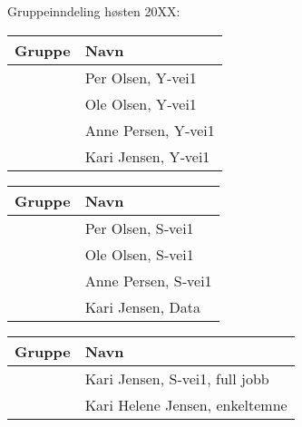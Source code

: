 \documentclass[11pt]{article}
\newcommand{\student}{\addtocounter{StudNo}{1}\arabic{StudNo}}
\newcommand{\gruppe}{\addtocounter{GruppeNo}{1}\arabic{GruppeNo}}
\begin{document}
Gruppeinndeling høsten 20XX:

\setcounter{StudNo}{0}
\setcounter{GruppeNo}{XX00}


\begin{table}[H]
  \centering
  \begin{tabular}{|p{2.5cm}|p{7cm}|}\hline
    Gruppe \gruppe & Navn \\\hline\hline
    \student & Per Olsen, Y‐vei1 \\\hline
    \student & Ole Olsen, Y‐vei1 \\\hline
    \student & Anne Persen, Y‐vei1 \\\hline
    \student & Kari Jensen, Y‐vei1 \\\hline
  \end{tabular}
\end{table}

\begin{table}[H]
  \centering
  \begin{tabular}{|p{2.5cm}|p{7cm}|}\hline
    Gruppe \gruppe & Navn \\\hline\hline
    \student & Per Olsen, S‐vei1 \\\hline
    \student & Ole Olsen, S‐vei1 \\\hline
    \student & Anne Persen, S‐vei1 \\\hline
    \student & Kari Jensen, Data \\\hline

  \end{tabular}
\end{table}

\begin{table}[H]
  \centering
  \begin{tabular}{|p{2.5cm}|p{7cm}|}\hline
    Gruppe \gruppe & Navn \\\hline\hline
    \student & Kari Jensen, S‐vei1, full jobb \\\hline
    \student & Kari Helene Jensen, enkeltemne \\\hline
  \end{tabular}
\end{table}
\end{document}
